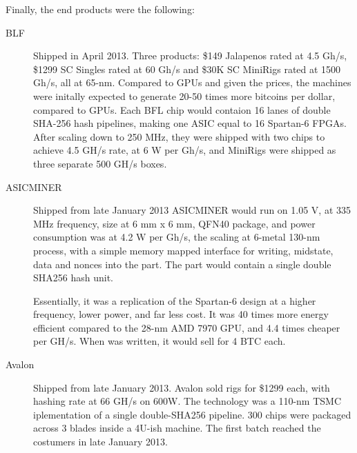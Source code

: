 Finally, the end products were the following:
\begin{description}
    \item[BLF] 
    Shipped in April 2013.
    Three products: \$149 Jalapenos rated at 4.5 Gh/s, \$1299 SC Singles rated at 60 Gh/s and \$30K SC MiniRigs rated at 1500 Gh/s, all at 65-nm.
    Compared to GPUs and given the prices, the machines were initally expected to generate 20-50 times more bitcoins per dollar, compared to GPUs.
    Each BFL chip would contaion 16 lanes of double SHA-256 hash pipelines, making one ASIC equal to 16 Spartan-6 FPGAs.
     After scaling down to 250 MHz, they were shipped with two chips to achieve 4.5 GH/s rate, at 6 W per Gh/s, and MiniRigs were shipped as three separate 500 GH/s boxes. 
    
    \item[ASICMINER]
    Shipped from late January 2013
    ASICMINER would run on 1.05 V, at 335 MHz frequency, size at 6 mm x 6 mm, QFN40 package, and power consumption was at 4.2 W per Gh/s, the scaling at 6-metal 130-nm process, with a simple memory mapped interface for writing, midstate, data and nonces into the part. 
The part would contain a single double SHA256 hash unit.

    Essentially, it was a replication of the Spartan-6 design at a higher frequency, lower power, and far less cost.
    It was 40 times more energy efficient compared to the 28-nm AMD 7970 GPU, and 4.4 times cheaper per GH/s.
    When \cite{bespoke-silicon} was written, it would sell for 4 BTC each.
    
    \item[Avalon]
    Shipped from late January 2013.
    Avalon sold rigs for \$1299 each, with hashing rate at 66 GH/s on 600W.
    The technology was a 110-nm TSMC iplementation of a single double-SHA256 pipeline.
    300 chips were packaged across 3 blades inside a 4U-ish machine.
    The first batch reached the costumers in late January 2013.
\end{description}

\cite{bespoke-silicon}

